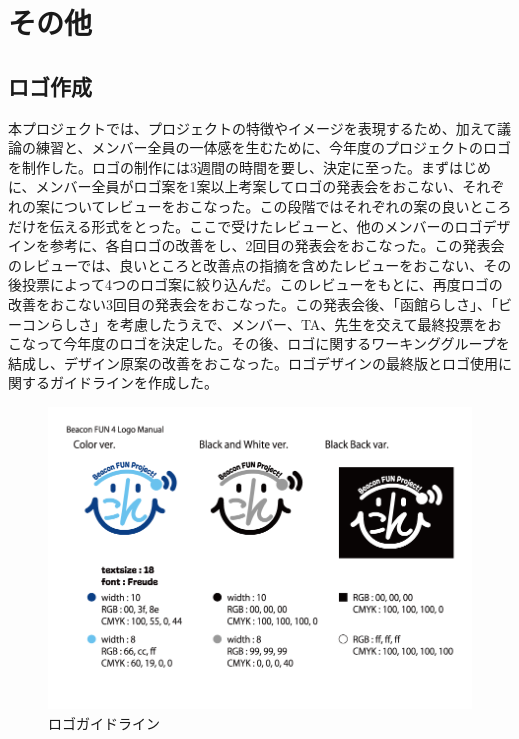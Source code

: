 \section{その他}
\subsection{ロゴ作成}
本プロジェクトでは、プロジェクトの特徴やイメージを表現するため、加えて議論の練習と、メンバー全員の一体感を生むために、今年度のプロジェクトのロゴを制作した。ロゴの制作には3週間の時間を要し、決定に至った。まずはじめに、メンバー全員がロゴ案を1案以上考案してロゴの発表会をおこない、それぞれの案についてレビューをおこなった。この段階ではそれぞれの案の良いところだけを伝える形式をとった。ここで受けたレビューと、他のメンバーのロゴデザインを参考に、各自ロゴの改善をし、2回目の発表会をおこなった。この発表会のレビューでは、良いところと改善点の指摘を含めたレビューをおこない、その後投票によって4つのロゴ案に絞り込んだ。このレビューをもとに、再度ロゴの改善をおこない3回目の発表会をおこなった。この発表会後、「函館らしさ」、「ビーコンらしさ」を考慮したうえで、メンバー、TA、先生を交えて最終投票をおこなって今年度のロゴを決定した。その後、ロゴに関するワーキンググループを結成し、デザイン原案の改善をおこなった。ロゴデザインの最終版とロゴ使用に関するガイドラインを作成した。

\begin{figure}[htbp]
    \begin{center}
    \includegraphics[width=14cm]{images/BeaconFUN4Logo_Manual.png}
    \end{center}
    \caption{ロゴガイドライン}
    \label{fig:LogoManual}
\end{figure}

